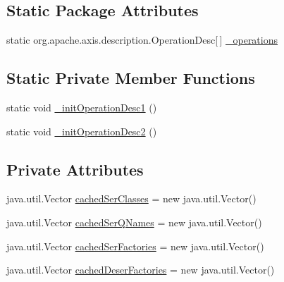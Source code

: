 \subsection*{Static Package Attributes}
\begin{DoxyCompactItemize}
\item 
static org.apache.axis.description.OperationDesc\mbox{[}$\,$\mbox{]} \hyperlink{classorg_1_1glite_1_1security_1_1voms_1_1service_1_1attributes_1_1VOMSAttributesSoapBindingStub_af9b983e25b8e2b37315a0b6242938b87}{\_\-operations}
\end{DoxyCompactItemize}
\subsection*{Static Private Member Functions}
\begin{DoxyCompactItemize}
\item 
static void \hyperlink{classorg_1_1glite_1_1security_1_1voms_1_1service_1_1attributes_1_1VOMSAttributesSoapBindingStub_a950578b3780fc31a0abe0499e93b228d}{\_\-initOperationDesc1} ()
\item 
static void \hyperlink{classorg_1_1glite_1_1security_1_1voms_1_1service_1_1attributes_1_1VOMSAttributesSoapBindingStub_a2d5e050bb2fcfa20d2797e24442de8bb}{\_\-initOperationDesc2} ()
\end{DoxyCompactItemize}
\subsection*{Private Attributes}
\begin{DoxyCompactItemize}
\item 
java.util.Vector \hyperlink{classorg_1_1glite_1_1security_1_1voms_1_1service_1_1attributes_1_1VOMSAttributesSoapBindingStub_a28fcd023493f71b38d25d3d16b870892}{cachedSerClasses} = new java.util.Vector()
\item 
java.util.Vector \hyperlink{classorg_1_1glite_1_1security_1_1voms_1_1service_1_1attributes_1_1VOMSAttributesSoapBindingStub_ad61123f5e69ee7faed6313158367e47b}{cachedSerQNames} = new java.util.Vector()
\item 
java.util.Vector \hyperlink{classorg_1_1glite_1_1security_1_1voms_1_1service_1_1attributes_1_1VOMSAttributesSoapBindingStub_aa3c0377ecdf8027a91f2d8116e98d670}{cachedSerFactories} = new java.util.Vector()
\item 
java.util.Vector \hyperlink{classorg_1_1glite_1_1security_1_1voms_1_1service_1_1attributes_1_1VOMSAttributesSoapBindingStub_a2645f73889348e5b4d836178e95f5051}{cachedDeserFactories} = new java.util.Vector()
\end{DoxyCompactItemize}


